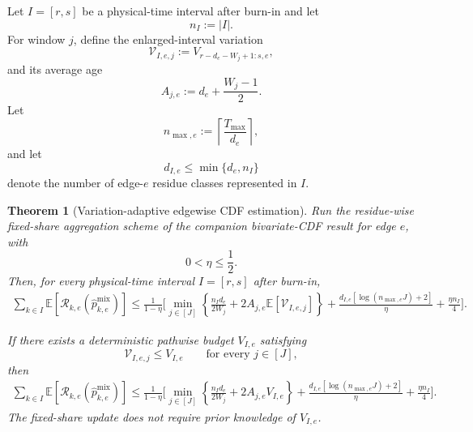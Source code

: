 \documentclass[11pt]{article}
\newtheorem{theorem}{Theorem}
\newcommand{\EE}{\mathbb{E}}
\begin{document}
Let $I=[r,s]$ be a physical-time interval after burn-in and let
\[
    n_I:=|I|.
\]
For window $j$, define the enlarged-interval variation
\begin{equation}
    \mathcal V_{I,e,j}
    :=
    V_{r-d_e-W_j+1:s,e},
    \label{eq:edge-enlarged-variation}
\end{equation}
and its average age
\begin{equation}
    A_{j,e}
    :=
    d_e+\frac{W_j-1}{2}.
    \label{eq:edge-average-age}
\end{equation}
Let
\begin{equation}
    n_{\max,e}
    :=
    \left\lceil
        \frac{T_{\max}}{d_e}
    \right\rceil,
    \label{eq:edge-meta-horizon}
\end{equation}
and let
\[
    d_{I,e}
    \le
    \min\{d_e,n_I\}
\]
denote the number of edge-$e$ residue classes represented in $I$.

\begin{theorem}[Variation-adaptive edgewise CDF estimation]
\label{thm:edge-variation-adaptive}
Run the residue-wise fixed-share aggregation scheme of the companion
bivariate-CDF result for edge $e$, with
\[
    0<\eta\le\frac12.
\]
Then, for every physical-time interval $I=[r,s]$ after burn-in,
\begin{equation}
\boxed{
\begin{aligned}
    \sum_{k\in I}
    \EE\!\left[
        \mathcal R_{k,e}
        \left(
            \widehat p^{\mathrm{mix}}_{k,e}
        \right)
    \right]
    \le
    \frac1{1-\eta}
    \Bigg[
        \min_{j\in[J]}
        \left\{
            \frac{n_I d_e}{2W_j}
            +
            2A_{j,e}
            \EE\!\left[
                \mathcal V_{I,e,j}
            \right]
        \right\}
        +
        \frac{
            d_{I,e}
            [\log(n_{\max,e}J)+2]
        }{\eta}
        +
        \frac{\eta n_I}{4}
    \Bigg].
\end{aligned}
}
\label{eq:edge-variation-adaptive-bound}
\end{equation}

If there exists a deterministic pathwise budget $V_{I,e}$ satisfying
\begin{equation}
    \mathcal V_{I,e,j}
    \le
    V_{I,e}
    \qquad
    \text{for every }j\in[J],
    \label{eq:edge-common-variation-budget}
\end{equation}
then
\begin{equation}
\boxed{
\begin{aligned}
    \sum_{k\in I}
    \EE\!\left[
        \mathcal R_{k,e}
        \left(
            \widehat p^{\mathrm{mix}}_{k,e}
        \right)
    \right]
    \le
    \frac1{1-\eta}
    \Bigg[
        \min_{j\in[J]}
        \left\{
            \frac{n_I d_e}{2W_j}
            +
            2A_{j,e}V_{I,e}
        \right\}
        +
        \frac{
            d_{I,e}
            [\log(n_{\max,e}J)+2]
        }{\eta}
        +
        \frac{\eta n_I}{4}
    \Bigg].
\end{aligned}
}
\label{eq:edge-common-variation-bound}
\end{equation}
The fixed-share update does not require prior knowledge of $V_{I,e}$.
\end{theorem}
\end{document}
